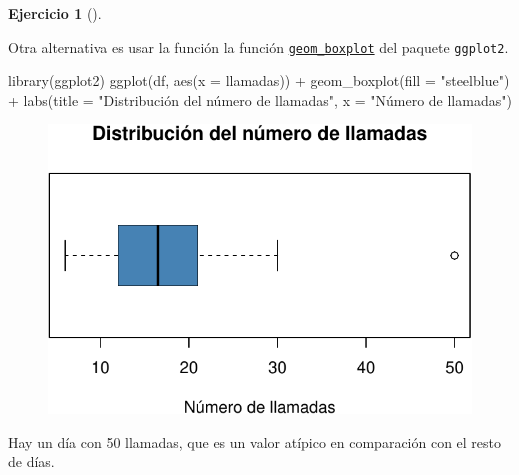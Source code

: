 \documentclass[
  a4paper,
]{scrreport}
\newenvironment{Shaded}{\begin{snugshade}}{\end{snugshade}}
\newcommand{\AttributeTok}[1]{\textcolor[rgb]{0.40,0.45,0.13}{#1}}
\newcommand{\FunctionTok}[1]{\textcolor[rgb]{0.28,0.35,0.67}{#1}}
\newcommand{\NormalTok}[1]{\textcolor[rgb]{0.00,0.23,0.31}{#1}}
\newcommand{\SpecialCharTok}[1]{\textcolor[rgb]{0.37,0.37,0.37}{#1}}
\newcommand{\StringTok}[1]{\textcolor[rgb]{0.13,0.47,0.30}{#1}}
\theoremstyle{definition}
\newtheorem{exercise}{Ejercicio}[chapter]
\theoremstyle{remark}
\begin{document}
\begin{exercise}[]
\begin{tcolorbox}
Otra alternativa es usar la función la función
\href{https://aprendeconalf.es/manual-r/07-graficos.html\#diagramas-de-cajas}{\texttt{geom\_boxplot}}
del paquete \texttt{ggplot2}.

\begin{Shaded}
\begin{Highlighting}[]
\FunctionTok{library}\NormalTok{(ggplot2)}
\FunctionTok{ggplot}\NormalTok{(df, }\FunctionTok{aes}\NormalTok{(}\AttributeTok{x =}\NormalTok{ llamadas)) }\SpecialCharTok{+}
    \FunctionTok{geom\_boxplot}\NormalTok{(}\AttributeTok{fill =} \StringTok{"steelblue"}\NormalTok{) }\SpecialCharTok{+}
    \FunctionTok{labs}\NormalTok{(}\AttributeTok{title =} \StringTok{"Distribución del número de llamadas"}\NormalTok{, }\AttributeTok{x =} \StringTok{"Número de llamadas"}\NormalTok{)}
\end{Highlighting}
\end{Shaded}

\begin{figure}[H]

{\centering \includegraphics{./03-frecuencias-graficos_files/figure-pdf/unnamed-chunk-11-1.pdf}

}

\end{figure}

Hay un día con 50 llamadas, que es un valor atípico en comparación con
el resto de días.

\begin{tcolorbox}[enhanced jigsaw, rightrule=.15mm, toptitle=1mm, colbacktitle=quarto-callout-tip-color!10!white, titlerule=0mm, colback=white, leftrule=.75mm, bottomtitle=1mm, colframe=quarto-callout-tip-color-frame, breakable, title=\textcolor{quarto-callout-tip-color}{\faLightbulb}\hspace{0.5em}{Solución}, arc=.35mm, coltitle=black, opacityback=0, bottomrule=.15mm, opacitybacktitle=0.6, left=2mm, toprule=.15mm]


\end{tcolorbox}
\end{tcolorbox}
\end{exercise}
\end{document}
